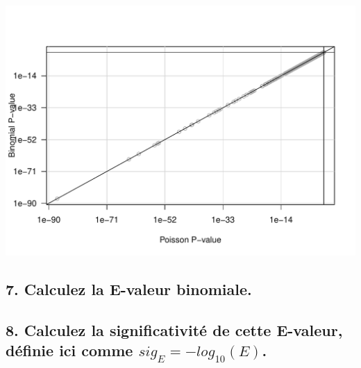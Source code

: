 \documentclass[]{article}
\newenvironment{Shaded}{\begin{snugshade}}{\end{snugshade}}
\newcommand{\KeywordTok}[1]{\textcolor[rgb]{0.94,0.87,0.69}{#1}}
\newcommand{\DataTypeTok}[1]{\textcolor[rgb]{0.87,0.87,0.75}{#1}}
\newcommand{\DecValTok}[1]{\textcolor[rgb]{0.86,0.86,0.80}{#1}}
\newcommand{\StringTok}[1]{\textcolor[rgb]{0.80,0.58,0.58}{#1}}
\newcommand{\CommentTok}[1]{\textcolor[rgb]{0.50,0.62,0.50}{#1}}
\newcommand{\OperatorTok}[1]{\textcolor[rgb]{0.94,0.94,0.82}{#1}}
\newcommand{\NormalTok}[1]{\textcolor[rgb]{0.80,0.80,0.80}{#1}}
\begin{document}
\begin{center}\includegraphics{figures/multiple_tests_practical_unnamed-chunk-7-1} \end{center}

\subsection{7. Calculez la E-valeur
binomiale.}\label{calculez-la-e-valeur-binomiale.}

\begin{Shaded}
\end{Shaded}

\subsection{\texorpdfstring{8. Calculez la significativité de cette
E-valeur, définie ici comme
\(sig_{E} = -log_{10}(E)\).}{8. Calculez la significativité de cette E-valeur, définie ici comme sig\_\{E\} = -log\_\{10\}(E).}}\label{calculez-la-significativite-de-cette-e-valeur-definie-ici-comme-sig_e--log_10e.}

\begin{Shaded}
\end{Shaded}
\end{document}
